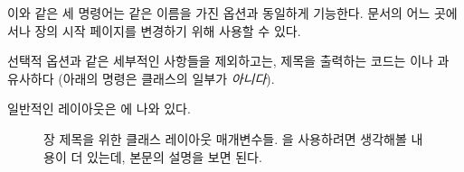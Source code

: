 이와 같은 세 명령어는 같은 이름을 가진 옵션과 동일하게 기능한다.
문서의 어느 곳에서나 장의 시작 페이지를 변경하기 위해 사용할 수 있다.

선택적 옵션과 같은 세부적인 사항들을 제외하고는,
\cmd{\chapter} 제목을 출력하는 코드는 \cmd{\book} 이나 \cmd{\part} 과 유사하다
(아래의  명령은 클래스의 일부가 \emph{아니다}).

\begin{lcode}
\newcommand{\chapterhead}[1]{ %
  \clearforchapter        %
  \thispagestyle{chapter} %
  \insertchapterspace     %
  \chapterheadstart       %
  \printchaptername\chapternamenum\printchapternum
  \afterchapternum        %
  \printchaptertitle{#1}  %
  \afterchaptertitle}     %
\end{lcode}
일반적인 레이아웃은 에 나와 있다.

\begin{figure}
\centering
\chapterdiagram
\caption{
	장 제목을 위한 클래스 레이아웃 매개변수들.
	을 사용하려면 생각해볼 내용이 더 있는데, 본문의 설명을 보면 된다.
} 
\label{lay:chap}
\end{figure}

